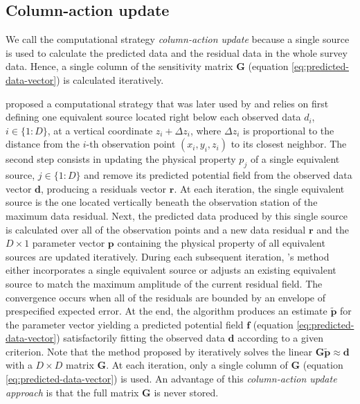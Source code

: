 \subsection{Column-action update}

We call the computational strategy \textit{column-action update} because a single source is used to calculate the predicted data 
and the residual data in the whole survey data.
Hence, a single column of the sensitivity matrix $\mathbf{G}$ (equation \ref{eq:predicted-data-vector}) is
calculated iteratively.

\cite{cordell1992} proposed a computational strategy that was later used by \cite{guspi-novara2009} and relies on
first defining one equivalent source located right below each observed data $d_{i}$, $i \in \{1:D\}$, at a vertical
coordinate $z_{i} + \Delta z_{i}$, where $\Delta z_{i}$ is proportional to the distance from the $i$-th observation point 
$(x_{i}, y_{i}, z_{i})$ to its closest neighbor.
The second step consists in updating the physical property $p_{j}$ of a single equivalent source, $j \in \{1:D\}$ and 
remove its predicted potential field from the observed data vector $\mathbf{d}$, producing a residuals vector $\mathbf{r}$.
At each iteration, the single equivalent source is the one located vertically beneath the observation station of the maximum data residual. 
Next, the predicted data produced by this single source is calculated over all of the observation points and 
a new data residual $\mathbf{r}$ and the $D \times 1$ parameter vector $\mathbf{p}$ containing the physical property 
of all equivalent sources are updated iteratively. 
During each subsequent iteration,  \citeauthor{cordell1992}'s method 
either incorporates a single equivalent source or adjusts an existing equivalent source to match the maximum amplitude 
of the current residual field.
The convergence occurs when all of the residuals are bounded by an envelope of prespecified expected error.
At the end, the algorithm produces an estimate $\tilde{\mathbf{p}}$ for the parameter vector yielding a predicted
potential field $\mathbf{f}$ (equation \ref{eq:predicted-data-vector}) satisfactorily fitting the observed data
$\mathbf{d}$ according to a given criterion.
Note that the method proposed by \cite{cordell1992} iteratively solves the linear $\mathbf{G} \tilde{\mathbf{p}} \approx \mathbf{d}$
with a $D \times D$ matrix $\mathbf{G}$. At each iteration, only a single column of $\mathbf{G}$ (equation \ref{eq:predicted-data-vector}) 
is used.
An advantage of this \textit{column-action update approach} is that the full matrix $\mathbf{G}$ is never stored.

